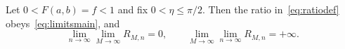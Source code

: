 \begin{theorem}\label{thm:limits}
Let $0<F(a,b)=f<1$ and fix $0<\eta\le\pi/2$. Then the ratio in~\eqref{eq:ratiodef} obeys~\eqref{eq:limitsmain}, and
\begin{equation}
 \lim_{n\to\infty}\lim_{M\to\infty}R_{M,n}=0,
 \qquad
 \lim_{M\to\infty}\lim_{n\to\infty}R_{M,n}=+\infty.
 \label{eq:iterated}
\end{equation}
\end{theorem}

